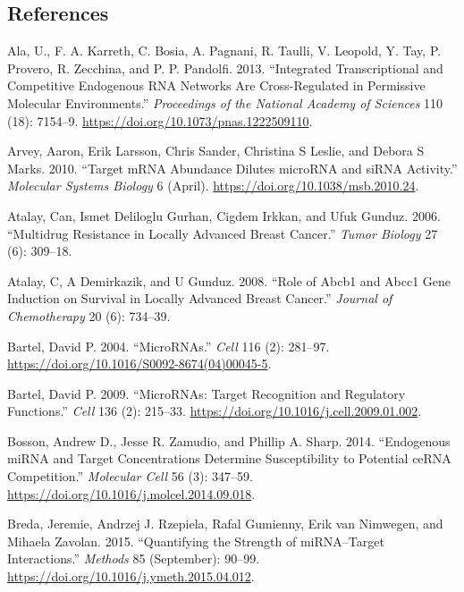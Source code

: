 \documentclass[]{article}
\begin{document}
\hypertarget{references}{%
\subsection*{References}\label{references}}

\hypertarget{refs}{}
\leavevmode\hypertarget{ref-ala_integrated_2013}{}%
Ala, U., F. A. Karreth, C. Bosia, A. Pagnani, R. Taulli, V. Leopold, Y.
Tay, P. Provero, R. Zecchina, and P. P. Pandolfi. 2013. ``Integrated
Transcriptional and Competitive Endogenous RNA Networks Are
Cross-Regulated in Permissive Molecular Environments.''
\emph{Proceedings of the National Academy of Sciences} 110 (18):
7154--9. \url{https://doi.org/10.1073/pnas.1222509110}.

\leavevmode\hypertarget{ref-arvey_target_2010}{}%
Arvey, Aaron, Erik Larsson, Chris Sander, Christina S Leslie, and Debora
S Marks. 2010. ``Target mRNA Abundance Dilutes microRNA and siRNA
Activity.'' \emph{Molecular Systems Biology} 6 (April).
\url{https://doi.org/10.1038/msb.2010.24}.

\leavevmode\hypertarget{ref-atalay2006multidrug}{}%
Atalay, Can, Ismet Deliloglu Gurhan, Cigdem Irkkan, and Ufuk Gunduz.
2006. ``Multidrug Resistance in Locally Advanced Breast Cancer.''
\emph{Tumor Biology} 27 (6): 309--18.

\leavevmode\hypertarget{ref-atalay2008role}{}%
Atalay, C, A Demirkazik, and U Gunduz. 2008. ``Role of Abcb1 and Abcc1
Gene Induction on Survival in Locally Advanced Breast Cancer.''
\emph{Journal of Chemotherapy} 20 (6): 734--39.

\leavevmode\hypertarget{ref-bartel_micrornas_2004}{}%
Bartel, David P. 2004. ``MicroRNAs.'' \emph{Cell} 116 (2): 281--97.
\url{https://doi.org/10.1016/S0092-8674(04)00045-5}.

\leavevmode\hypertarget{ref-bartel_micrornas:_2009}{}%
Bartel, David P. 2009. ``MicroRNAs: Target Recognition and Regulatory
Functions.'' \emph{Cell} 136 (2): 215--33.
\url{https://doi.org/10.1016/j.cell.2009.01.002}.

\leavevmode\hypertarget{ref-bosson_endogenous_2014}{}%
Bosson, Andrew D., Jesse R. Zamudio, and Phillip A. Sharp. 2014.
``Endogenous miRNA and Target Concentrations Determine Susceptibility to
Potential ceRNA Competition.'' \emph{Molecular Cell} 56 (3): 347--59.
\url{https://doi.org/10.1016/j.molcel.2014.09.018}.

\leavevmode\hypertarget{ref-breda_quantifying_2015}{}%
Breda, Jeremie, Andrzej J. Rzepiela, Rafal Gumienny, Erik van Nimwegen,
and Mihaela Zavolan. 2015. ``Quantifying the Strength of miRNA--Target
Interactions.'' \emph{Methods} 85 (September): 90--99.
\url{https://doi.org/10.1016/j.ymeth.2015.04.012}.
\end{document}
